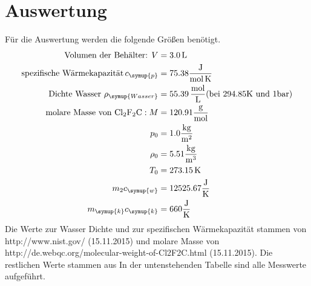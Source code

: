 \section{Auswertung}
\label{sec:Auswertung}
Für die Auswertung werden die folgende Größen benötigt.
\begin{align*}
  \text{Volumen der Behälter: } V &= 3.0 \,\si{\liter} \\
  \text{spezifische Wärmekapazität}\, c_\symup{p} &= 75.38\si{\frac{\joule}{\mol\,\kelvin}}  \\
  \text{Dichte Wasser } \rho_\symup{Wasser} &= 55.39 \,\si{\frac{\mol}{\liter}}
        (\text{bei } 294.85 \si{\kelvin} \text{ und } 1\si{\bar}) \\
  \text{molare Masse von } \ce{Cl2F2C}: M &= 120.91 \si{\frac{\gram}{\mol}} \\
  p_0 &= 1.0 \si{\frac{\kilo\gram}{\meter^2}}  \\
  \rho_0 &= 5.51  \si{\frac{\kilo\gram}{\meter^3}} \\
  T_0 &= 273.15 \,  \si{\kelvin}  \\
  m_2c_\symup{w} &= 12525.67 \si{\frac{\joule}{\kelvin}} \\
  m_\symup{k}c_\symup{k} &= 660   \si{\frac{\joule}{\kelvin}}
\end{align*}
Die Werte zur Wasser Dichte und zur spezifischen Wärmekapazität stammen von
http://www.nist.gov/ (15.11.2015) und molare Masse von http://de.webqc.org/molecular-weight-of-Cl2F2C.html (15.11.2015).
Die restlichen Werte stammen aus \cite{sample}
In der untenstehenden Tabelle sind alle Messwerte aufgeführt.
